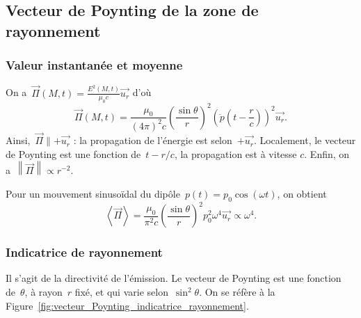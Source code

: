 \subsection{Vecteur de Poynting de la zone de rayonnement}

\subsubsection{Valeur instantanée et moyenne}

On a~$\vec{\Pi}(M,t)=\frac{E^{2}(M,t)}{\mu_0 c}\vec{u_r}$ d'où
\begin{equation*}
    \boxed{
        \vec{\Pi}(M,t)=
        \frac{\mu_0}{(4\pi)^{2}c}\left(\frac{\sin\theta}{r}\right)^{2}\left(
            \ddot{p}\left(t-\frac{r}{c}\right)
        \right)^{2}\vec{u_r}.
    }
\end{equation*}
Ainsi,~$\vec{\Pi}\parallel+\vec{u_r}$ : la propagation de l'énergie est selon~$+\vec{u_r}$. Localement, le vecteur de Poynting est une fonction de~$t-r/c$, la propagation est à vitesse $c$. Enfin, on a~$\left\lVert\vec{\Pi}\right\rVert\propto r^{-2}$.

Pour un mouvement sinusoïdal du dipôle~$p(t)=p_0\cos(\omega t)$, on obtient
\begin{equation*}
    \boxed{
        \left\langle\vec{\Pi}\right\rangle=\frac{\mu_0}{\pi^{2}c}\left(\frac{\sin\theta}{r}\right)^{2}p_0^{2}\omega^{4}\vec{u_r}\propto\omega^{4}.
    }
\end{equation*}

\subsubsection{Indicatrice de rayonnement}

Il s'agit de la directivité de l'émission. Le vecteur de Poynting est une fonction de~$\theta$, à rayon~$r$ fixé, et qui varie selon~$\sin^{2}\theta$. On se réfère à la Figure~\ref{fig:vecteur_Poynting_indicatrice_rayonnement}.

